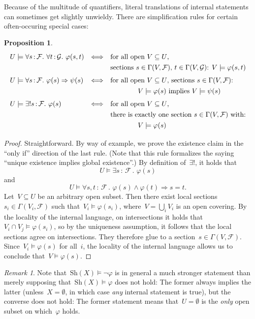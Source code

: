 \documentclass[10pt]{amsart}
\theoremstyle{definition}
\theoremstyle{plain}
\newtheorem{prop}[defn]{Proposition}
\theoremstyle{remark}
\newtheorem{rem}[defn]{Remark}
\newcommand{\F}{\mathcal{F}}
\renewcommand{\G}{\mathcal{G}}
\newcommand{\Sh}{\mathrm{Sh}}
\newcommand{\?}{\,{:}\,}
\renewcommand{\_}{\mathpunct{.}\,}
\begin{document}
Because of the multitude of quantifiers, literal translations of internal statements
can sometimes get slightly unwieldy. There are simplification rules for certain
often-occuring special cases:
\begin{prop}\label{prop:simplification}
    \[ \renewcommand{\arraystretch}{1.3}\begin{array}{@{}lcl@{}}
      U \models \forall s\?\F\_ \forall t\?\G\_ \varphi(s,t)
      &\Longleftrightarrow&
      \text{for all open~$V \subseteq U$,} \\
      && \text{sections~$s \in \Gamma(V,\F)$, $t \in \Gamma(V,\G)$:
      $V \models \varphi(s,t)$} \\[0.3em]
      U \models \forall s\?\F\_ \varphi(s) \Rightarrow \psi(s)
      &\Longleftrightarrow&
      \text{for all open~$V \subseteq U$, sections~$s \in \Gamma(V,\F)$:} \\
      &&\qquad\qquad \text{$V \models \varphi(s)$ implies $V \models \psi(s)$}
      \\[0.3em]
      U \models \exists!s\?\F\_ \varphi(s)
      &\Longleftrightarrow&
      \text{for all open~$V \subseteq U$,} \\
      &&
      \text{there is exactly one section~$s \in \Gamma(V,\F)$ with:} \\
      &&\qquad\qquad V \models \varphi(s)
    \end{array} \]
\end{prop}
\begin{proof}Straightforward. By way of example, we prove the existence claim
in the ``only if'' direction of the last rule. (Note that this rule formalizes
the saying ``unique existence implies global existence''.) By definition of~$\exists!$, it
holds that
\[ U \models \exists s\?\F\_ \varphi(s) \]
and
\[ U \models \forall s,t\?\F\_ \varphi(s) \wedge \varphi(t) \Rightarrow s = t.  \]
Let~$V \subseteq U$ be an arbitrary open subset. Then there exist local
sections~$s_i \in \Gamma(V_i,\F)$ such that~$V_i \models \varphi(s_i)$, where~$V
= \bigcup_i V_i$ is an open covering. By the locality of the internal language,
on intersections it holds that~$V_i \cap V_j \models \varphi(s_i)$, so by the
uniqueness assumption, it follows that the local sections agree on intersections.
They therefore glue to a section~$s \in \Gamma(V,\F)$. Since~$V_i \models
\varphi(s)$ for all~$i$, the locality of the internal language allows us to
conclude that~$V \models \varphi(s)$.
\end{proof}

\begin{rem}Note that~$\Sh(X) \models \neg\varphi$ is in general a much stronger
statement than merely supposing that~$\Sh(X) \models \varphi$ does not hold:
The former always implies the latter (unless~$X = \emptyset$, in which case
\emph{any} internal statement is true), but the converse does not hold: The
former statement means that~$U = \emptyset$ is the \emph{only} open subset on
which~$\varphi$ holds.\end{rem}
\end{document}

